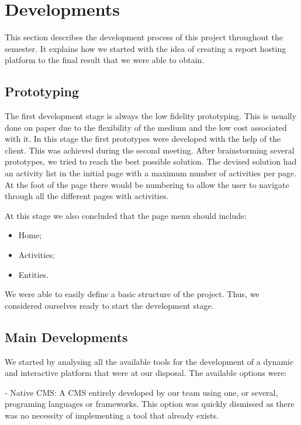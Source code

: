 \documentclass[a4paper,12pt,journal,twoside,compsoc]{PPIEEEtran}
\begin{document}
\section{Developments}

This section describes the development process of this project throughout the semester. It explains how we started with the idea of creating a report hosting platform to the final result that we were able to obtain.

\subsection{Prototyping}

The first development stage is always the low fidelity prototyping. This is usually done on paper due to the flexibility of the medium and the low cost associated with it. In this stage the first prototypes were developed with the help of the client. This was achieved during the second meeting.
After brainstorming several prototypes, we tried to reach the best possible solution. The devised solution had an activity list in the initial page with a maximum number of activities per page. At the foot of the page there would be numbering to allow the user to navigate through all the different pages with activities.

At this stage we also concluded that the page menu should include:
\begin{itemize}
	\item Home;
	\item Activities;
	\item Entities.
\end{itemize}

We were able to easily define a basic structure of the project. Thus, we considered ourselves ready to start the development stage.

\subsection{Main Developments}

We started by analysing all the available tools for the development of a dynamic and interactive platform that were at our disposal. The available options were:

- Native \ac{CMS}: A \ac{CMS} entirely developed by our team using one, or several, programing languages or frameworks. This option was quickly dismissed as there was no necessity of implementing a tool that already exists.
\end{document}
